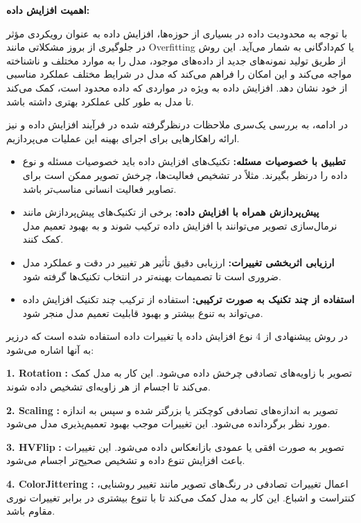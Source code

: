  \textbf{اهمیت افزایش داده:}

 با توجه به محدودیت داده در بسیاری از حوزه‌ها، افزایش داده به عنوان رویکردی مؤثر در جلوگیری از بروز مشکلاتی مانند %
\gls{Overfitting}
  یا کم‌دادگانی به شمار می‌آید. این روش از طریق تولید نمونه‌های جدید از داده‌های موجود، مدل را به موارد مختلف و ناشناخته مواجه می‌کند و این امکان را فراهم می‌کند که مدل در شرایط مختلف عملکرد مناسبی از خود نشان دهد. افزایش داده به ویژه در مواردی که داده محدود است، کمک می‌کند تا مدل به طور کلی عملکرد بهتری داشته باشد. 
  
  در ادامه، به بررسی یک‌سری ملاحظات درنظرگرفته شده در فرآیند افزایش داده و نیز ارائه راهکارهایی برای اجرای بهینه این عملیات می‌پردازیم.
  
\begin{itemize}
	\item \textbf{تطبیق با خصوصیات مسئله:}
	تکنیک‌های افزایش داده باید خصوصیات مسئله و نوع داده را درنظر بگیرند. مثلاً در تشخیص فعالیت‌ها، چرخش تصویر ممکن است برای تصاویر فعالیت انسانی مناسب‌تر باشد.
	
	\item \textbf{پیش‌پردازش همراه با افزایش داده:}
	برخی از تکنیک‌های پیش‌پردازش مانند نرمال‌سازی تصویر می‌توانند با افزایش داده ترکیب شوند و به بهبود تعمیم مدل کمک کنند.
	
	\item \textbf{ارزیابی اثربخشی تغییرات:}
	ارزیابی دقیق تأثیر هر تغییر در دقت و عملکرد مدل ضروری است تا تصمیمات بهینه‌تر در انتخاب تکنیک‌ها گرفته شود.
	
	\item \textbf{استفاده از چند تکنیک به صورت ترکیبی:}
	استفاده از ترکیب چند تکنیک افزایش داده می‌تواند به تنوع بیشتر و بهبود قابلیت تعمیم مدل منجر شود.
\end{itemize}

در روش پیشنهادی از 4 نوع افزایش داده یا تغییرات داده استفاده شده است که درزیر به آنها اشاره می‌شود:

\textbf{1. \gls{Rotation}}
\textbf{:}
تصویر با زاویه‌های تصادفی چرخش داده می‌شود. این کار به مدل کمک می‌کند تا اجسام از هر زاویه‌ای تشخیص داده شوند.

\textbf{2. \gls{Scaling}}
\textbf{:}
تصویر به اندازه‌های تصادفی کوچکتر یا بزرگتر شده و سپس به اندازه مورد نظر برگردانده می‌شود. این تغییرات موجب بهبود تعمیم‌پذیری مدل می‌شود.

\textbf{3.  \gls{HVFlip}}
\textbf{:}
تصویر به صورت افقی یا عمودی بازانعکاس داده می‌شود. این تغییرات باعث افزایش تنوع داده و تشخیص صحیح‌تر اجسام می‌شود.

\textbf{4.  \gls{ColorJittering}}
\textbf{:}
اعمال تغییرات تصادفی در رنگ‌های تصویر مانند تغییر روشنایی، کنتراست و اشباع. این کار به مدل کمک می‌کند تا با تنوع بیشتری در برابر تغییرات نوری مقاوم باشد.

